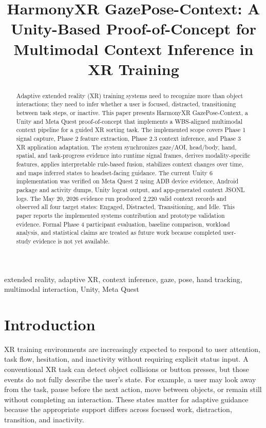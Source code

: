 \documentclass[conference]{IEEEtran}
\title{HarmonyXR GazePose-Context: A Unity-Based Proof-of-Concept for Multimodal Context Inference in XR Training}
\author{
\IEEEauthorblockN{Varun Siddarju}
\IEEEauthorblockA{OpenSpatialAI Research Project\\
HarmonyXR GazePose-Context}
\and
\IEEEauthorblockN{Lavanya D.}
\IEEEauthorblockA{OpenSpatialAI Research Project\\
HarmonyXR GazePose-Context}
}
\begin{document}
\maketitle

\begin{abstract}
Adaptive extended reality (XR) training systems need to recognize more than object interactions; they need to infer whether a user is focused, distracted, transitioning between task steps, or inactive. This paper presents HarmonyXR GazePose-Context, a Unity and Meta Quest proof-of-concept that implements a WBS-aligned multimodal context pipeline for a guided XR sorting task. The implemented scope covers Phase 1 signal capture, Phase 2 feature extraction, Phase 2.3 context inference, and Phase 3 XR application adaptation. The system synchronizes gaze/AOI, head/body, hand, spatial, and task-progress evidence into runtime signal frames, derives modality-specific features, applies interpretable rule-based fusion, stabilizes context changes over time, and maps inferred states to headset-facing guidance. The current Unity 6 implementation was verified on Meta Quest 2 using ADB device evidence, Android package and activity dumps, Unity logcat output, and app-generated context JSONL logs. The May 20, 2026 evidence run produced 2,220 valid context records and observed all four target states: Engaged, Distracted, Transitioning, and Idle. This paper reports the implemented systems contribution and prototype validation evidence. Formal Phase 4 participant evaluation, baseline comparison, workload analysis, and statistical claims are treated as future work because completed user-study evidence is not yet available.
\end{abstract}

\begin{IEEEkeywords}
extended reality, adaptive XR, context inference, gaze, pose, hand tracking, multimodal interaction, Unity, Meta Quest
\end{IEEEkeywords}

\section{Introduction}
XR training environments are increasingly expected to respond to user attention, task flow, hesitation, and inactivity without requiring explicit status input. A conventional XR task can detect object collisions or button presses, but those events do not fully describe the user's state. For example, a user may look away from the task, pause before the next action, move between objects, or remain still without completing an interaction. These states matter for adaptive guidance because the appropriate support differs across focused work, distraction, transition, and inactivity.
\end{document}

